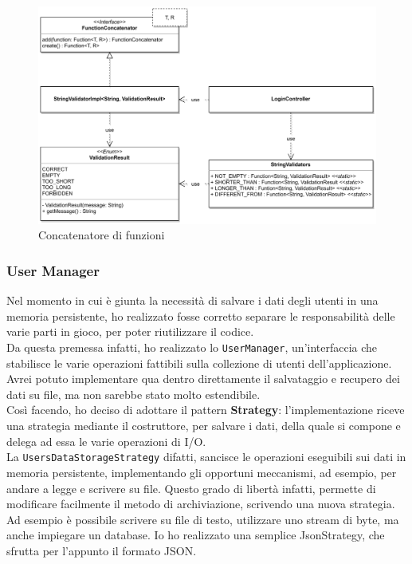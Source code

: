 \documentclass[a4paper,12pt]{report}
\begin{document}
\begin{figure}[ht]
    \begin{center}
        \centering
        \includegraphics[width=\textwidth]{img/Manuel/shadow/FunctionConcatenator.png}
    \end{center}
    \caption{Concatenatore di funzioni}
    \label{img:FunctionConcatenator}
\end{figure}
%

\subsubsection*{User Manager}
\label{UserManager}

Nel momento in cui è giunta la necessità di salvare i dati degli utenti in una memoria persistente, ho realizzato fosse corretto separare le responsabilità delle varie parti in gioco, per poter riutilizzare il codice.
\\
Da questa premessa infatti, ho realizzato lo \texttt{UserManager}, un'interfaccia che stabilisce le varie operazioni fattibili sulla collezione di utenti dell'applicazione. Avrei potuto implementare qua dentro direttamente il salvataggio e recupero dei dati su file, ma non sarebbe stato molto estendibile.
\\
Così facendo, ho deciso di adottare il pattern \textbf{Strategy}: l'implementazione riceve una strategia mediante il costruttore, per salvare i dati, della quale si compone e delega ad essa le varie operazioni di I/O.
\\
La \texttt{UsersDataStorageStrategy} difatti, sancisce le operazioni eseguibili sui dati in memoria persistente, implementando gli opportuni meccanismi, ad esempio, per andare a legge e scrivere su file. Questo grado di libertà infatti, permette di modificare facilmente il metodo di archiviazione, scrivendo una nuova strategia. Ad esempio è possibile scrivere su file di testo, utilizzare uno stream di byte, ma anche impiegare un database. Io ho realizzato una semplice JsonStrategy, che sfrutta per l'appunto il formato JSON.
\end{document}
